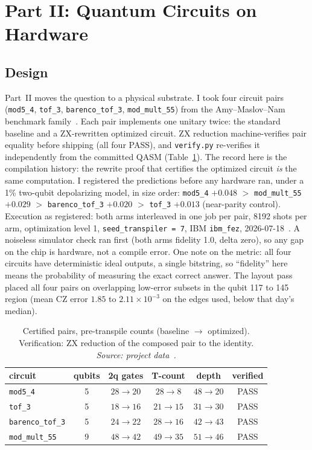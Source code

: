 \section{Part II: Quantum Circuits on Hardware}\label{sec:part2}

\subsection{Design}

Part~II moves the question to a physical substrate. I took four circuit pairs (\texttt{mod5\_4}, \texttt{tof\_3}, \texttt{barenco\_tof\_3}, \texttt{mod\_mult\_55}) from the Amy--Maslov--Nam benchmark family~\cite{amy2014tpar,nam2018automated}. Each pair implements one unitary twice: the standard baseline and a ZX-rewritten optimized circuit. ZX reduction machine-verifies pair equality before shipping (all four PASS), and \texttt{verify.py} re-verifies it independently from the committed QASM (Table~\ref{tab:pairs}). The record here is the compilation history: the rewrite proof that certifies the optimized circuit \emph{is} the same computation. I registered the predictions before any hardware ran, under a 1\% two-qubit depolarizing model, in size order: \texttt{mod5\_4} $+0.048$ $>$ \texttt{mod\_mult\_55} $+0.029$ $>$ \texttt{barenco\_tof\_3} $+0.020$ $>$ \texttt{tof\_3} $+0.013$ (near-parity control). Execution as registered: both arms interleaved in one job per pair, 8192 shots per arm, optimization level 1, \texttt{seed\_transpiler\,=\,7}, IBM \texttt{ibm\_fez}, 2026-07-18~\cite{javadi2024qiskit}. A noiseless simulator check ran first (both arms fidelity 1.0, delta zero), so any gap on the chip is hardware, not a compile error. One note on the metric: all four circuits have deterministic ideal outputs, a single bitstring, so ``fidelity'' here means the probability of measuring the exact correct answer. The layout pass placed all four pairs on overlapping low-error subsets in the qubit 117 to 145 region (mean CZ error $1.85$ to $2.11\times10^{-3}$ on the edges used, below that day's median).

\begin{table}[htbp]
\centering\small
\caption{Certified pairs, pre-transpile counts (baseline $\to$ optimized). Verification: ZX reduction of the composed pair to the identity. \emph{Source: project data~\cite{appliedrepo2026}.}}
\label{tab:pairs}
\begin{tabular}{lccccc}
\toprule
circuit & qubits & 2q gates & T-count & depth & verified \\
\midrule
\texttt{mod5\_4} & 5 & $28 \to 20$ & $28 \to 8$ & $48 \to 20$ & PASS \\
\texttt{tof\_3} & 5 & $18 \to 16$ & $21 \to 15$ & $31 \to 30$ & PASS \\
\texttt{barenco\_tof\_3} & 5 & $24 \to 22$ & $28 \to 16$ & $42 \to 43$ & PASS \\
\texttt{mod\_mult\_55} & 9 & $48 \to 42$ & $49 \to 35$ & $51 \to 46$ & PASS \\
\bottomrule
\end{tabular}
\end{table}

